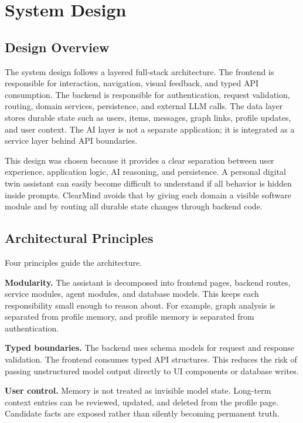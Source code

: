\chapter{System Design}

\section{Design Overview}

The system design follows a layered full-stack architecture. The frontend is responsible for interaction, navigation, visual feedback, and typed API consumption. The backend is responsible for authentication, request validation, routing, domain services, persistence, and external LLM calls. The data layer stores durable state such as users, items, messages, graph links, profile updates, and user context. The AI layer is not a separate application; it is integrated as a service layer behind API boundaries.

This design was chosen because it provides a clear separation between user experience, application logic, AI reasoning, and persistence. A personal digital twin assistant can easily become difficult to understand if all behavior is hidden inside prompts. ClearMind avoids that by giving each domain a visible software module and by routing all durable state changes through backend code.

\section{Architectural Principles}

Four principles guide the architecture.

\textbf{Modularity.} The assistant is decomposed into frontend pages, backend routes, service modules, agent modules, and database models. This keeps each responsibility small enough to reason about. For example, graph analysis is separated from profile memory, and profile memory is separated from authentication.

\textbf{Typed boundaries.} The backend uses schema models for request and response validation. The frontend consumes typed API structures. This reduces the risk of passing unstructured model output directly to UI components or database writes.

\textbf{User control.} Memory is not treated as invisible model state. Long-term context entries can be reviewed, updated, and deleted from the profile page. Candidate facts are exposed rather than silently becoming permanent truth.

